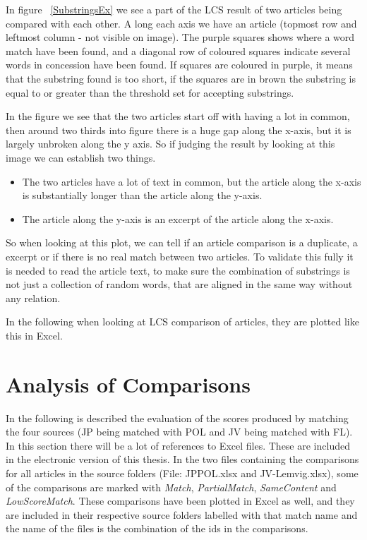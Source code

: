 In figure ~\ref{SubstringsEx} we see a part of the LCS result of two articles being compared with each other. A long each axis we have an article (topmost row and leftmost column - not visible on image). The purple squares shows where a word match have been found, and a diagonal row of coloured squares indicate several words in concession have been found. If squares are coloured in purple, it means that the substring found is too short, if the squares are in brown the substring is equal to or greater than the threshold set for accepting substrings.

In the figure we see that the two articles start off with having a lot in common, then around two thirds into figure there is a huge gap along the x-axis, but it is largely unbroken along the y axis. So if judging the result by looking at this image we can establish two things.

\begin{itemize}
\item The two articles have a lot of text in common, but the article along the x-axis is substantially longer than the article along the y-axis.
\item The article along the y-axis is an excerpt of the article along the x-axis.
\end{itemize}

So when looking at this plot, we can tell if an article comparison is a duplicate, a excerpt or if there is no real match between two articles. To validate this fully it is needed to read the article text, to make sure the combination of substrings is not just a collection of random words, that are aligned in the same way without any relation.

In the following when looking at LCS comparison of articles, they are plotted like this in Excel. 

\section{Analysis of Comparisons}
In the following is described the evaluation of the scores produced by matching the four sources (JP being matched with POL and JV being matched with FL). In this section there will be a lot of references to Excel files. These are included in the electronic version of this thesis. In the two files containing the comparisons for all articles in the source folders (File: JPPOL.xlsx and JV-Lemvig.xlsx), some of the comparisons are marked with \textit{Match}, \textit{PartialMatch}, \textit{SameContent} and \textit{LowScoreMatch}. These comparisons have been plotted in Excel as well, and they are included in their respective source folders labelled with that match name and the name of the files is the combination of the ids in the comparisons.

